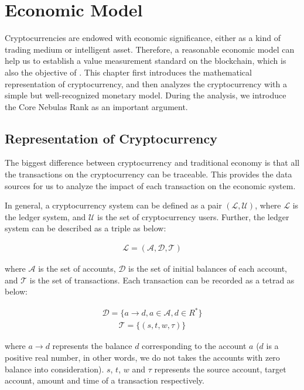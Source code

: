 \section{Economic Model}
Cryptocurrencies are endowed with economic significance, either as a kind of trading medium or intelligent asset. Therefore, a reasonable economic model can help us to establish a value measurement standard on the blockchain, which is also the objective of \nrcore. This chapter first introduces the mathematical representation of cryptocurrency, and then analyzes the cryptocurrency with a simple but well-recognized monetary model. During the analysis, we introduce the Core Nebulas Rank as an important argument.

\subsection{Representation of Cryptocurrency}
The biggest difference between cryptocurrency and traditional economy is that all the transactions on the cryptocurrency can be traceable. This provides the data sources for us to analyze the impact of each transaction on the economic system.

In general, a cryptocurrency system can be defined as a pair $(\mathcal{L}, \mathcal{U})$, where $\mathcal{L}$ is the ledger system, and $\mathcal{U}$ is the set of cryptocurrency users. Further, the ledger system can be described as a triple as below:

\begin{align}
\mathcal{L} = (\mathcal{A}, \mathcal{D}, \mathcal{T})
\end{align}

\noindent where $\mathcal{A}$ is the set of accounts, $\mathcal{D}$ is the set of initial balances of each account, and $\mathcal{T}$ is the set of transactions. Each transaction can be recorded as a tetrad as below:

\begin{align}
\mathcal{D} = \{a \rightarrow d, a{\in}\mathcal{A}, d{\in}R^*\}
\end{align}
\begin{align}
\mathcal{T} = \{(s, t, w, \tau)\}
\end{align}

\noindent where $a \rightarrow d$ represents the balance $d$ corresponding to the account $a$ ($d$ is a positive real number, in other words, we do not takes the accounts with zero balance into consideration). $s$, $t$, $w$ and $\tau$ represents the source account, target account, amount and time of a transaction respectively.

